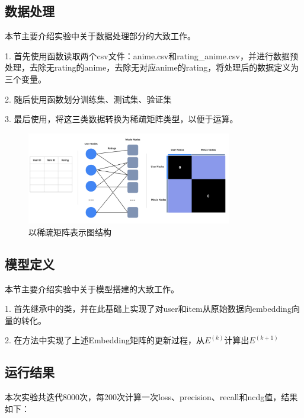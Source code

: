 \documentclass[hyperref,a4paper,UTF8]{ctexart}
\begin{document}
\subsection{数据处理}
本节主要介绍实验中关于数据处理部分的大致工作。

1. 首先使用函数读取两个csv文件：anime.csv和rating\_anime.csv，并进行数据预处理，去除无rating的anime，去除无对应anime的rating，将处理后的数据定义为三个变量。

2. 随后使用函数划分训练集、测试集、验证集

3. 最后使用，将这三类数据转换为稀疏矩阵类型，以便于运算。

\begin{figure}[ht]
    \centering
    \includegraphics[width=0.8\textwidth]{fig/sparse_matrix.png}
    \caption{以稀疏矩阵表示图结构}
    \label{fig:sparse_matrix}
\end{figure}

\subsection{模型定义}
本节主要介绍实验中关于模型搭建的大致工作。

1. 首先继承中的类，并在此基础上实现了对user和item从原始数据向embedding向量的转化。

2. 在方法中实现了上述Embedding矩阵的更新过程，从$E^{(k)}$计算出$E^{(k+1)}$
\subsection{运行结果}

本次实验共迭代8000次，每200次计算一次loss、precision、recall和ncdg值，结果如下：
\end{document}
